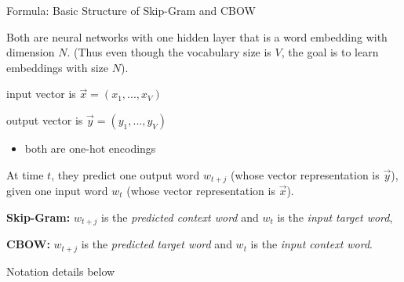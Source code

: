 \begin{frame}{Formula: Basic Structure of Skip-Gram and CBOW}
    
    \begin{itemizeSpaced}{5pt}
        \item Both are neural networks with one hidden layer that is a word embedding with dimension $N$. (Thus even though the vocabulary size is $V$, the goal is to learn embeddings with size $N$).
        
        \item input vector is $\overrightarrow{x} = (x_1,..., x_V)$ 
        
        \item output vector is $\overrightarrow{y} = (y_1,...,y_V)$ 
        
        \begin{itemize}
            \item both are one-hot encodings
        \end{itemize}
        
        \item At time $t$, they predict one output word $w_{t+j}$ (whose vector representation is $\overrightarrow{y}$), given one input word $w_t$ (whose vector representation is $\overrightarrow{x}$).
        
        
        \item \textbf{Skip-Gram: }$w_{t+j}$ is the \emph{predicted context word} and $w_t$ is the \emph{input target word},
        
        \item \textbf{CBOW: } $w_{t+j}$ is the \emph{predicted target word} and $w_t$ is the \emph{input context word}.
        
        
        \item Notation details below\footnotemark
    
    \end{itemizeSpaced}

    
\end{frame}



